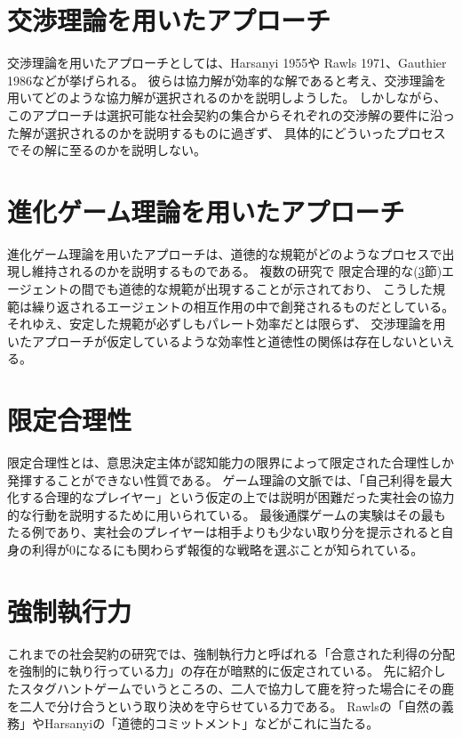 \section{交渉理論を用いたアプローチ}
\label{bargaining-theory}
交渉理論を用いたアプローチとしては、Harsanyi 1955\cite{harsanyi1955}や
Rawls 1971\cite{rawls1971}、Gauthier 1986\cite{gauthier1986}などが挙げられる。
彼らは協力解が効率的な解であると考え、交渉理論を用いてどのような協力解が選択されるのかを説明しようした。
しかしながら、このアプローチは選択可能な社会契約の集合からそれぞれの交渉解の要件に沿った解が選択されるのかを説明するものに過ぎず、
具体的にどういったプロセスでその解に至るのかを説明しない。

\section{進化ゲーム理論を用いたアプローチ}
\label{evolutionary-game-theory}
進化ゲーム理論を用いたアプローチは、道徳的な規範がどのようなプロセスで出現し維持されるのかを説明するものである。
複数の研究で\cite{sugden1986}\cite{binmore1994}\cite{binmore1998}\cite{skyrms1996}
限定合理的な(\ref{bounded-rationalty}節)エージェントの間でも道徳的な規範が出現することが示されており、
こうした規範は繰り返されるエージェントの相互作用の中で創発されるものだとしている。
それゆえ、安定した規範が必ずしもパレート効率だとは限らず、
交渉理論を用いたアプローチが仮定しているような効率性と道徳性の関係は存在しないといえる。\cite{sep-game-ethics}

\section{限定合理性}
\label{bounded-rationalty}
限定合理性とは、意思決定主体が認知能力の限界によって限定された合理性しか発揮することができない性質である。\cite{simon1947}
ゲーム理論の文脈では、「自己利得を最大化する合理的なプレイヤー」という仮定の上では説明が困難だった実社会の協力的な行動を説明するために用いられている。\cite{sep-bounded-rationality}
最後通牒ゲームの実験はその最もたる例であり、実社会のプレイヤーは相手よりも少ない取り分を提示されると自身の利得が0になるにも関わらず報復的な戦略を選ぶことが知られている。\cite{GUTH1982367}

\section{強制執行力}
これまでの社会契約の研究では、強制執行力と呼ばれる「合意された利得の分配を強制的に執り行っている力」の存在が暗黙的に仮定されている。
先に紹介したスタグハントゲームでいうところの、二人で協力して鹿を狩った場合にその鹿を二人で分け合うという取り決めを守らせている力である。
Rawlsの「自然の義務」\cite{rawls1971}やHarsanyiの「道徳的コミットメント」\cite{harsanyi1955}などがこれに当たる。\cite{binmore2005}

